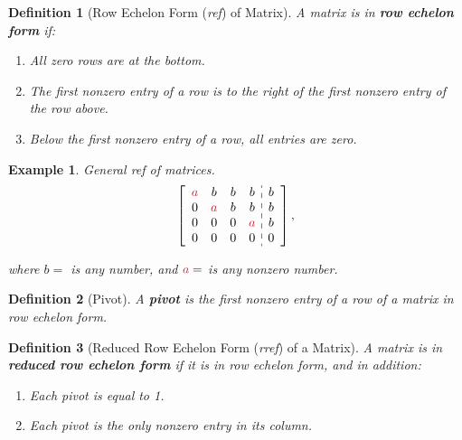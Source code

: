 \documentclass[12pt, a4paper]{article}
\newtheorem{df}{Definition}[subsection]
\newtheorem{eg}{Example}[subsection]
\begin{document}
\begin{df}[Row Echelon Form (\emph{ref}) of Matrix]
A matrix is in \textbf{row echelon form} if: 
\begin{enumerate}
\item All zero rows are at the bottom.
\item The first nonzero entry of a row is to the \textit{right} of the first nonzero entry of the row above. 
\item Below the first nonzero entry of a row, all entries are zero.
\end{enumerate}
\end{df}

\begin{eg} 
General \emph{ref} of matrices. 
$$\left[\begin{array}{c:c}\begin{matrix}\textcolor{red}{a}&b&b&b\\0&\textcolor{red}{a}&b&b\\0&0&0&\textcolor{red}{a}\\0&0&0&0\end{matrix}&\begin{matrix}b\\b\\b\\0\end{matrix}\end{array}\right], $$

where $b=$ is any number, and $\textcolor{red}{a}=$ is any nonzero number.
\end{eg}
\begin{df}[Pivot]
A \textbf{\textit{pivot}} is the first nonzero entry of a row of a matrix in row echelon form.
\end{df}

\begin{df}[Reduced Row Echelon Form (\emph{rref}) of a Matrix]
A matrix is in \textbf{reduced row echelon form} if it is in row echelon form, and in addition:
\begin{enumerate}
\item[4.] Each pivot is equal to 1. 
\item[5.] Each pivot is the only nonzero entry in its column.
\end{enumerate}
\end{df}
\end{document}

